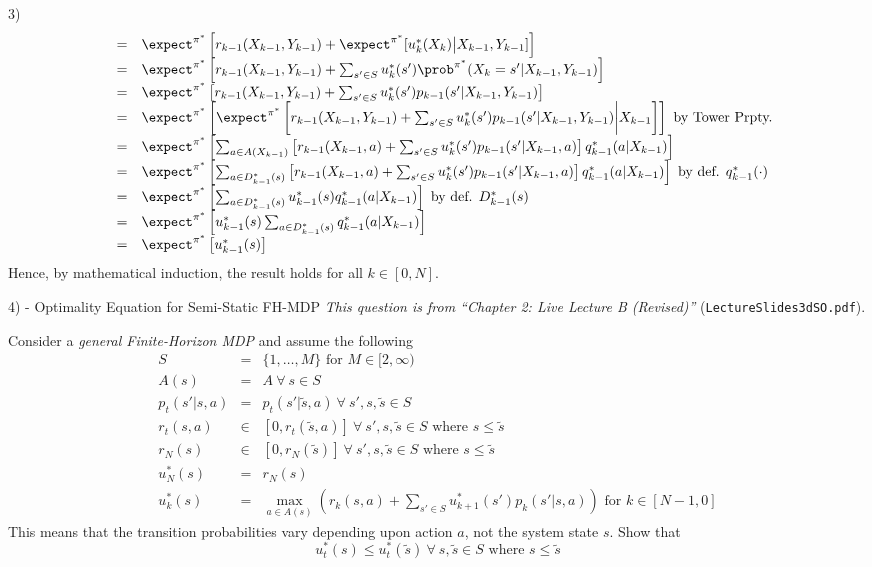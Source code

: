 \documentclass[11pt,a4paper]{article}
\begin{document}
\begin{answer}{3)}
\[\begin{array}{rrl}
    &=&\expect^{\pi^*}\left[r_{k-1}(X_{k-1},Y_{k-1})+\expect^{\pi^*}[u_k^*(X_k)\big|X_{k-1},Y_{k-1}]\right]\\
    &=&\expect^{\pi^*}\left[r_{k-1}(X_{k-1},Y_{k-1})+\sum_{s'\in S}u_k^*(s')\prob^{\pi^*}(X_k=s'|X_{k-1},Y_{k-1})\right]\\
    &=&\expect^{\pi^*}\left[r_{k-1}(X_{k-1},Y_{k-1})+\sum_{s'\in S}u_k^*(s')p_{k-1}(s'|X_{k-1},Y_{k-1})\right]\\
    &=&\expect^{\pi^*}\left[\expect^{\pi^*}\left[r_{k-1}(X_{k-1},Y_{k-1})+\sum_{s'\in S}u_k^*(s')p_{k-1}(s'|X_{k-1},Y_{k-1})\bigg|X_{k-1}\right]\right]\text{ by Tower Prpty.}\\
    &=&\expect^{\pi^*}\left[\sum_{a\in A(X_{k-1})}\left[r_{k-1}(X_{k-1},a)+\sum_{s'\in S}u_k^*(s')p_{k-1}(s'|X_{k-1},a)\right]q_{k-1}^*(a|X_{k-1})\right]\\
    &=&\expect^{\pi^*}\left[\sum_{a\in D_{k-1}^*(s)}\left[r_{k-1}(X_{k-1},a)+\sum_{s'\in S}u_k^*(s')p_{k-1}(s'|X_{k-1},a)\right]q_{k-1}^*(a|X_{k-1})\right]\text{ by def. }q_{k-1}^*(\cdot)\\
    &=&\expect^{\pi^*}\left[\sum_{a\in D_{k-1}^*(s)}u_{k-1}^*(s)q_{k-1}^*(a|X_{k-1})\right]\text{ by def. }D_{k-1}^*(s)\\
    &=&\expect^{\pi^*}\left[u_{k-1}^*(s)\sum_{a\in D_{k-1}^*(s)}q_{k-1}^*(a|X_{k-1})\right]\\
    &=&\expect^{\pi^*}\left[u_{k-1}^*(s)\right]
  \end{array}\]
  Hence, by mathematical induction, the result holds for all $k\in[0,N].$
\end{answer}

\newpage
\begin{question}{4) - Optimality Equation for Semi-Static FH-MDP}
  \textit{This question is from ``Chapter 2: Live Lecture B (Revised)''} (\texttt{LectureSlides3dSO.pdf}).
  \par Consider a \textit{general Finite-Horizon MDP} and assume the following
  \[\begin{array}{rcl}
    S&=&\{1,\dots,M\}\text{ for }M\in[2,\infty)\\
    A(s)&=&A\ \forall\ s\in S\\
    p_t(s'|s,a)&=&p_t(s'|\tilde{s},a)\ \forall\ s',s,\tilde{s}\in S\\
    r_t(s,a)&\in&[0,r_t(\tilde{s},a)]\ \forall\ s',s,\tilde{s}\in S\text{ where }s\leq\tilde{s}\\
    r_N(s)&\in&[0,r_N(\tilde{s})]\ \forall\ s',s,\tilde{s}\in S\text{ where }s\leq\tilde{s}\\
    u_N^*(s)&=&r_N(s)\\
    u_k^*(s)&=&\max_{a\in A(s)}\left(r_k(s,a)+\sum_{s'\in S}u_{k+1}^*(s')p_k(s'|s,a)\right)\text{ for }k\in[N-1,0]
  \end{array}\]
  This means that the transition probabilities vary depending upon action $a$, not the system state $s$.
  Show that
  \[ u_t^*(s)\leq u_t^*(\tilde{s})\ \forall\ s,\tilde{s}\in S\text{ where }s\leq\tilde{s} \]
\end{question}
\end{document}
